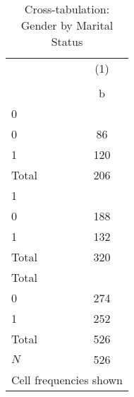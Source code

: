\begin{table}[htbp]\centering
\def\sym#1{\ifmmode^{#1}\else\(^{#1}\)\fi}
\caption{Cross-tabulation: Gender by Marital Status}\label{tab:0201-crosstab_gender_married}
\begin{tabular}{l*{1}{c}}
\toprule
            &\multicolumn{1}{c}{(1)}\\
            &\multicolumn{1}{c}{}\\
            &           b\\
\midrule
0           &            \\
0           &          86\\
1           &         120\\
Total       &         206\\
\midrule
1           &            \\
0           &         188\\
1           &         132\\
Total       &         320\\
\midrule
Total       &            \\
0           &         274\\
1           &         252\\
Total       &         526\\
\midrule
\(N\)       &         526\\
\bottomrule
\multicolumn{2}{l}{\footnotesize Cell frequencies shown}\\
\end{tabular}
\end{table}
